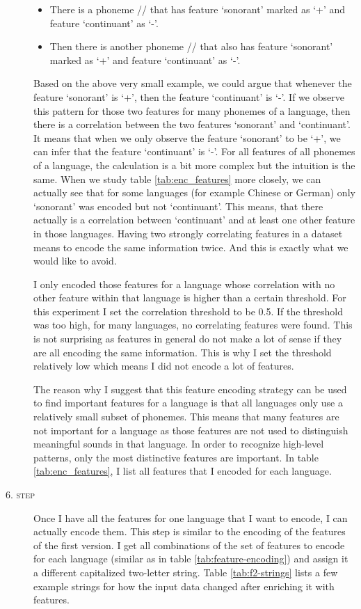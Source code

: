 \begin{description}
    \begin{itemize}
        \item There is a phoneme // that has feature `sonorant' marked as `+' and feature `continuant' as `-'.
        \item Then there is another phoneme // that also has feature `sonorant' marked as `+' and feature `continuant' as `-'.
    \end{itemize}
    Based on the above very small example, we could argue that whenever the feature `sonorant' is `+', then the feature `continuant' is `-'. If we observe this pattern for those two features for many phonemes of a language, then there is a correlation between the two features `sonorant' and `continuant'. It means that when we only observe the feature `sonorant' to be `+', we can infer that the  feature `continuant' is `-'. For all features of all phonemes of a language, the calculation is a bit more complex but the intuition is the same. When we study table \ref{tab:enc_features} more closely, we can actually see that for some languages (for example Chinese or German) only `sonorant' was encoded but not `continuant'. This means, that there actually is a correlation between `continuant' and at least one other feature in those languages. Having two strongly correlating features in a dataset means to encode the same information twice. And this is exactly what we would like to avoid.
    
    I only encoded those features for a language whose correlation with no other feature within that language is higher than a certain threshold. For this experiment I set the correlation threshold to be 0.5. If the threshold was too high, for many languages, no correlating features were found. This is not surprising as features in general do not make a lot of sense if they are all encoding the same information. This is why I set the threshold relatively low which means I did not encode a lot of features. 
    
    The reason why I suggest that this feature encoding strategy can be used to find important features for a language is that all languages only use a relatively small subset of phonemes. This means that many features are not important for a language as those features are not used to distinguish meaningful sounds in that language. In order to recognize high-level patterns, only the most distinctive features are important. In table \ref{tab:enc_features}, I list all features that I encoded for each language.
    
    \item[\textsc{6. step}] Once I have all the features for one language that I want to encode, I can actually encode them. This step is similar to the encoding of the features of the first version. I get all combinations of the set of features to encode for each language (similar as in table \ref{tab:feature-encoding}) and assign it a different capitalized two-letter string. Table \ref{tab:f2-strings} lists a few example strings for how the input data changed after enriching it with features.  
\end{description}

